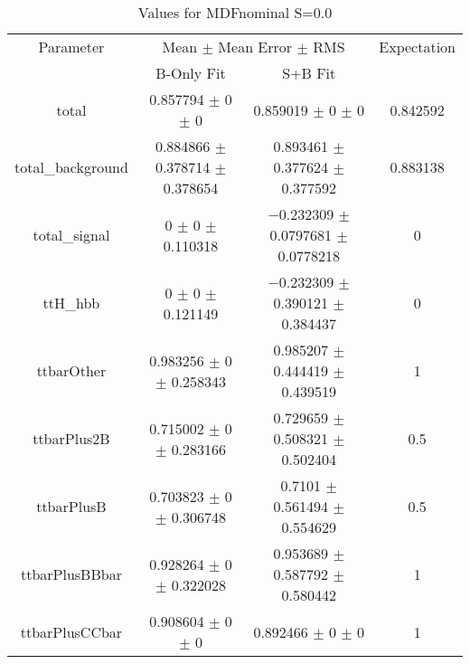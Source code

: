 \begin{table}
\centering
\caption{Values for MDFnominal S=0.0}
\begin{tabular}{cccc}
\toprule
Parameter & \multicolumn{2}{c}{Mean $\pm$ Mean Error $\pm$ RMS} & Expectation\\
 & B-Only Fit & S+B Fit & \\
\midrule
total & \num{0.857794} $\pm$ \num{0} $\pm$ \num{0} & \num{0.859019} $\pm$ \num{0} $\pm$ \num{0} & \num{0.842592}\\
total\_background & \num{0.884866} $\pm$ \num{0.378714} $\pm$ \num{0.378654} & \num{0.893461} $\pm$ \num{0.377624} $\pm$ \num{0.377592} & \num{0.883138}\\
total\_signal & \num{0} $\pm$ \num{0} $\pm$ \num{0.110318} & \num{-0.232309} $\pm$ \num{0.0797681} $\pm$ \num{0.0778218} & \num{0}\\
ttH\_hbb & \num{0} $\pm$ \num{0} $\pm$ \num{0.121149} & \num{-0.232309} $\pm$ \num{0.390121} $\pm$ \num{0.384437} & \num{0}\\
ttbarOther & \num{0.983256} $\pm$ \num{0} $\pm$ \num{0.258343} & \num{0.985207} $\pm$ \num{0.444419} $\pm$ \num{0.439519} & \num{1}\\
ttbarPlus2B & \num{0.715002} $\pm$ \num{0} $\pm$ \num{0.283166} & \num{0.729659} $\pm$ \num{0.508321} $\pm$ \num{0.502404} & \num{0.5}\\
ttbarPlusB & \num{0.703823} $\pm$ \num{0} $\pm$ \num{0.306748} & \num{0.7101} $\pm$ \num{0.561494} $\pm$ \num{0.554629} & \num{0.5}\\
ttbarPlusBBbar & \num{0.928264} $\pm$ \num{0} $\pm$ \num{0.322028} & \num{0.953689} $\pm$ \num{0.587792} $\pm$ \num{0.580442} & \num{1}\\
ttbarPlusCCbar & \num{0.908604} $\pm$ \num{0} $\pm$ \num{0} & \num{0.892466} $\pm$ \num{0} $\pm$ \num{0} & \num{1}\\
\bottomrule
\end{tabular}
\end{table}